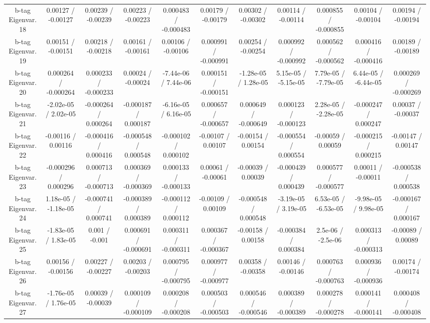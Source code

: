 \begin{table}[htbp]
\begin{center}
\begin{tabular}{|c|c|c|c|c|c|c|c|c|c|c|}
  b-tag Eigenvar. 18 & 0.00127 / -0.00127 & 0.00239 / -0.00239 & 0.00223 / -0.00223 & 0.000483 / -0.000483 & 0.00179 / -0.00179 & 0.00302 / -0.00302 & 0.00114 / -0.00114 & 0.000855 / -0.000855 & 0.00104 / -0.00104 & 0.00194 / -0.00194 \\ 
  b-tag Eigenvar. 19 & 0.00151 / -0.00151 & 0.00218 / -0.00218 & 0.00161 / -0.00161 & 0.00106 / -0.00106 & 0.000991 / -0.000991 & 0.00254 / -0.00254 & 0.000992 / -0.000992 & 0.000562 / -0.000562 & 0.000416 / -0.000416 & 0.00189 / -0.00189 \\ 
  b-tag Eigenvar. 20 & 0.000264 / -0.000264 & 0.000233 / -0.000233 & 0.00024 / -0.00024 & -7.44e-06 / 7.44e-06 & 0.000151 / -0.000151 & -1.28e-05 / 1.28e-05 & 5.15e-05 / -5.15e-05 & 7.79e-05 / -7.79e-05 & 6.44e-05 / -6.44e-05 & 0.000269 / -0.000269 \\ 
  b-tag Eigenvar. 21 & -2.02e-05 / 2.02e-05 & -0.000264 / 0.000264 & -0.000187 / 0.000187 & -6.16e-05 / 6.16e-05 & 0.000657 / -0.000657 & 0.000649 / -0.000649 & 0.000123 / -0.000123 & 2.28e-05 / -2.28e-05 & -0.000247 / 0.000247 & 0.00037 / -0.00037 \\ 
  b-tag Eigenvar. 22 & -0.00116 / 0.00116 & -0.000416 / 0.000416 & -0.000548 / 0.000548 & -0.000102 / 0.000102 & -0.00107 / 0.00107 & -0.00154 / 0.00154 & -0.000554 / 0.000554 & -0.00059 / 0.00059 & -0.000215 / 0.000215 & -0.00147 / 0.00147 \\ 
  b-tag Eigenvar. 23 & -0.000296 / 0.000296 & 0.000713 / -0.000713 & 0.000369 / -0.000369 & 0.000133 / -0.000133 & 0.00061 / -0.00061 & -0.00039 / 0.00039 & -0.000439 / 0.000439 & 0.000577 / -0.000577 & 0.00011 / -0.00011 & -0.000538 / 0.000538 \\ 
  b-tag Eigenvar. 24 & 1.18e-05 / -1.18e-05 & -0.000741 / 0.000741 & -0.000389 / 0.000389 & -0.000112 / 0.000112 & -0.00109 / 0.00109 & -0.000548 / 0.000548 & -3.19e-05 / 3.19e-05 & 6.53e-05 / -6.53e-05 & -9.98e-05 / 9.98e-05 & -0.000167 / 0.000167 \\ 
  b-tag Eigenvar. 25 & -1.83e-05 / 1.83e-05 & 0.001 / -0.001 & 0.000691 / -0.000691 & 0.000311 / -0.000311 & 0.000367 / -0.000367 & -0.00158 / 0.00158 & -0.000384 / 0.000384 & 2.5e-06 / -2.5e-06 & 0.000313 / -0.000313 & -0.00089 / 0.00089 \\ 
  b-tag Eigenvar. 26 & 0.00156 / -0.00156 & 0.00227 / -0.00227 & 0.00203 / -0.00203 & 0.000795 / -0.000795 & 0.000977 / -0.000977 & 0.00358 / -0.00358 & 0.00146 / -0.00146 & 0.000763 / -0.000763 & 0.000936 / -0.000936 & 0.00174 / -0.00174 \\ 
  b-tag Eigenvar. 27 & -1.76e-05 / 1.76e-05 & 0.00039 / -0.00039 & 0.000109 / -0.000109 & 0.000208 / -0.000208 & 0.000503 / -0.000503 & 0.000546 / -0.000546 & 0.000389 / -0.000389 & 0.000278 / -0.000278 & 0.000141 / -0.000141 & 0.000408 / -0.000408 \\ 

\end{tabular}
\end{center}
\end{table}
